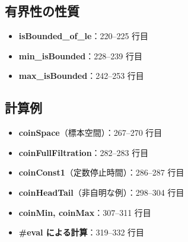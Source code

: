 \documentclass[12pt,a4paper,ja=standard]{bxjsarticle}
\theoremstyle{definition}
\begin{document}
\subsection*{有界性の性質}

\begin{itemize}
    \item \textbf{isBounded\_of\_le}：220--225 行目
    \item \textbf{min\_isBounded}：228--239 行目
    \item \textbf{max\_isBounded}：242--253 行目
\end{itemize}

\subsection*{計算例}

\begin{itemize}
    \item \textbf{coinSpace}（標本空間）：267--270 行目
    \item \textbf{coinFullFiltration}：282--283 行目
    \item \textbf{coinConst1}（定数停止時間）：286--287 行目
    \item \textbf{coinHeadTail}（非自明な例）：298--304 行目
    \item \textbf{coinMin, coinMax}：307--311 行目
    \item \textbf{\#eval による計算}：319--332 行目
\end{itemize}
\end{document}
